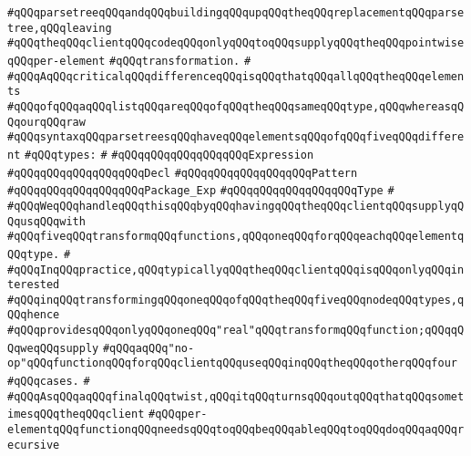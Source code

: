 \verb|#qQQqparsetreeqQQqandqQQqbuildingqQQqupqQQqtheqQQqreplacementqQQqparsetree,qQQqleaving|\newline
\verb|#qQQqtheqQQqclientqQQqcodeqQQqonlyqQQqtoqQQqsupplyqQQqtheqQQqpointwiseqQQqper-element|\newline
\verb|#qQQqtransformation.|\newline
\verb|#|\newline
\verb|#qQQqAqQQqcriticalqQQqdifferenceqQQqisqQQqthatqQQqallqQQqtheqQQqelements|\newline
\verb|#qQQqofqQQqaqQQqlistqQQqareqQQqofqQQqtheqQQqsameqQQqtype,qQQqwhereasqQQqourqQQqraw|\newline
\verb|#qQQqsyntaxqQQqparsetreesqQQqhaveqQQqelementsqQQqofqQQqfiveqQQqdifferent|\newline
\verb|#qQQqtypes:|\newline
\verb|#|\newline
\verb|#qQQqqQQqqQQqqQQqqQQqExpression|\newline
\verb|#qQQqqQQqqQQqqQQqqQQqDecl|\newline
\verb|#qQQqqQQqqQQqqQQqqQQqPattern|\newline
\verb|#qQQqqQQqqQQqqQQqqQQqPackage_Exp|\newline
\verb|#qQQqqQQqqQQqqQQqqQQqType|\newline
\verb|#|\newline
\verb|#qQQqWeqQQqhandleqQQqthisqQQqbyqQQqhavingqQQqtheqQQqclientqQQqsupplyqQQqusqQQqwith|\newline
\verb|#qQQqfiveqQQqtransformqQQqfunctions,qQQqoneqQQqforqQQqeachqQQqelementqQQqtype.|\newline
\verb|#|\newline
\verb|#qQQqInqQQqpractice,qQQqtypicallyqQQqtheqQQqclientqQQqisqQQqonlyqQQqinterested|\newline
\verb|#qQQqinqQQqtransformingqQQqoneqQQqofqQQqtheqQQqfiveqQQqnodeqQQqtypes,qQQqhence|\newline
\verb|#qQQqprovidesqQQqonlyqQQqoneqQQq"real"qQQqtransformqQQqfunction;qQQqqQQqweqQQqsupply|\newline
\verb|#qQQqaqQQq"no-op"qQQqfunctionqQQqforqQQqclientqQQquseqQQqinqQQqtheqQQqotherqQQqfour|\newline
\verb|#qQQqcases.|\newline
\verb|#|\newline
\verb|#qQQqAsqQQqaqQQqfinalqQQqtwist,qQQqitqQQqturnsqQQqoutqQQqthatqQQqsometimesqQQqtheqQQqclient|\newline
\verb|#qQQqper-elementqQQqfunctionqQQqneedsqQQqtoqQQqbeqQQqableqQQqtoqQQqdoqQQqaqQQqrecursive|\newline
